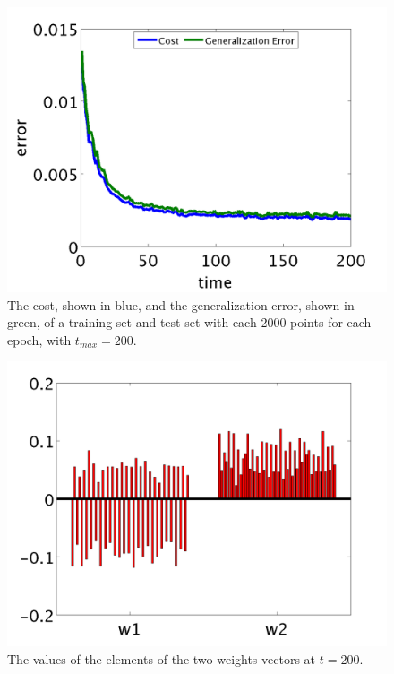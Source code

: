
\begin{figure}
	\centering
	\includegraphics[width=\columnwidth]{./img/errors_train_2000_test_2000.png}
	\caption{The cost, shown in blue, and the generalization error, shown in green, of a training set and test set with each 2000 points for each epoch, with $t_{max} = 200$.}
	\label{fig:exp:errors}
\end{figure}

\begin{figure}
	\centering
	\includegraphics[width=\columnwidth]{./img/weights_train_2000_test_2000.png}
	\caption{The values of the elements of the two weights vectors at $t = 200$.}
	\label{fig:exp:weights}
\end{figure}